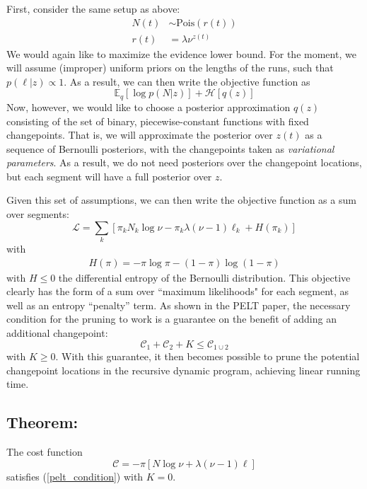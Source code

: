 \documentclass[11pt]{article}
\begin{document}
First, consider the same setup as above:
\begin{align}
    N(t) &\sim \mathrm{Pois}(r(t)) \\
    r(t) &= \lambda \nu^{z(t)}
\end{align}
We would again like to maximize the evidence lower bound. For the moment, we will assume (improper) uniform priors on the lengths of the runs, such that $p(\ell|z) \propto 1$. As a result, we can then write the objective function as
\begin{equation}
    \mathbb{E}_q \left[\log p(N|z) \right] + \mathcal{H}[q(z)]
\end{equation}
Now, however, we would like to choose a posterior approximation $q(z)$ consisting of the set of binary, piecewise-constant functions with fixed changepoints. That is, we will approximate the posterior over $z(t)$ as a sequence of Bernoulli posteriors, with the changepoints taken as \emph{variational parameters}. As a result, we do not need posteriors over the changepoint locations, but each segment will have a full posterior over $z$.

Given this set of assumptions, we can then write the objective function as a sum over segments:
\begin{equation}
    \mathcal{L} = \sum_k \left[
    \pi_k N_k \log \nu - \pi_k \lambda (\nu - 1) \ell_k + H(\pi_k)
    \right]
\end{equation}
with
\begin{align}
    H(\pi) = -\pi \log \pi - (1 - \pi) \log (1 - \pi)
\end{align}
with $H \le 0$ the differential entropy of the Bernoulli distribution. This objective clearly has the form of a sum over ``maximum likelihoods" for each segment, as well as an entropy ``penalty'' term. As shown in the PELT paper, the necessary condition for the pruning to work is a guarantee on the benefit of adding an additional changepoint:
\begin{equation}
    \label{pelt_condition}
    \mathcal{C}_1 + \mathcal{C}_2 + K \le \mathcal{C}_{1 \cup 2}
\end{equation}
with $K \ge 0$. With this guarantee, it then becomes possible to prune the potential changepoint locations in the recursive dynamic program, achieving linear running time.

\subsection*{Theorem:} The cost function
\begin{equation}
    \mathcal{C} = -\pi [N \log \nu + \lambda (\nu - 1)\ell]
\end{equation}
satisfies (\ref{pelt_condition}) with $K = 0$.
\end{document}
